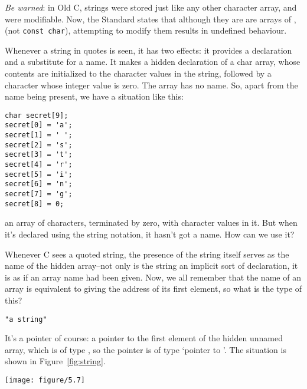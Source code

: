    \textit{Be warned}: in Old C, strings were stored just like any other
    character array, and were modifiable. Now, the Standard states that
    although they are are arrays of \kchar, (not \texttt{const
    char}), attempting to modify them results in undefined
    behaviour.


   Whenever a string in quotes is seen, it has two effects: it provides
    a declaration and a substitute for a name. It makes a hidden declaration
    of a char array, whose contents are initialized to the character values
    in the string, followed by a character whose integer value is zero. The
    array has no name. So, apart from the name being present, we have
    a situation like this:


   \begin{Verbatim}
char secret[9];
secret[0] = 'a';
secret[1] = ' ';
secret[2] = 's';
secret[3] = 't';
secret[4] = 'r';
secret[5] = 'i';
secret[6] = 'n';
secret[7] = 'g';
secret[8] = 0;
\end{Verbatim}

   an array of characters, terminated by zero, with character values in
    it. But when it's declared using the string notation, it hasn't got
    a name. How can we use it?


   Whenever C sees a quoted string, the presence of the string itself
    serves as the name of the hidden array--not only is the string an
    implicit sort of declaration, it is as if an array name had been given.
    Now, we all remember that the name of an array is equivalent to giving
    the address of its first element, so what is the type of this?


   \begin{Verbatim}
"a string"
\end{Verbatim}

   It's a pointer of course: a pointer to the first element of the hidden
    unnamed array, which is of type \kchar, so the pointer is of
    type `pointer to \kchar'. The situation is shown in
    Figure~\ref{fig:string}.


    \begin{figure*}[htb]\centering
      \texttt{[image: figure/5.7]}
      \caption*{Diagram showing an unnamed array of 'const char' values, where the            last item has the value '0', and showing that a 'const char *'            value that points to the first of them can be used as a string.}
      \caption{\label{fig:string}Effect of using a string}
    \end{figure*}



